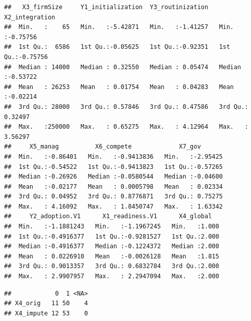 \documentclass[
]{article}
\newenvironment{Shaded}{\begin{snugshade}}{\end{snugshade}}
\newcommand{\DataTypeTok}[1]{\textcolor[rgb]{0.13,0.29,0.53}{#1}}
\newcommand{\DecValTok}[1]{\textcolor[rgb]{0.00,0.00,0.81}{#1}}
\newcommand{\KeywordTok}[1]{\textcolor[rgb]{0.13,0.29,0.53}{\textbf{#1}}}
\newcommand{\NormalTok}[1]{#1}
\newcommand{\OperatorTok}[1]{\textcolor[rgb]{0.81,0.36,0.00}{\textbf{#1}}}
\newcommand{\StringTok}[1]{\textcolor[rgb]{0.31,0.60,0.02}{#1}}
\begin{document}
\begin{verbatim}
##   X3_firmSize     Y1_initialization  Y3_routinization   X2_integration    
##  Min.   :    65   Min.   :-5.42871   Min.   :-1.41257   Min.   :-0.75756  
##  1st Qu.:  6586   1st Qu.:-0.05625   1st Qu.:-0.92351   1st Qu.:-0.75756  
##  Median : 14000   Median : 0.32550   Median : 0.05474   Median :-0.53722  
##  Mean   : 26253   Mean   : 0.01754   Mean   : 0.04283   Mean   :-0.02214  
##  3rd Qu.: 28000   3rd Qu.: 0.57846   3rd Qu.: 0.47586   3rd Qu.: 0.32497  
##  Max.   :250000   Max.   : 0.65275   Max.   : 4.12964   Max.   : 3.56297  
##     X5_manag          X6_compete             X7_gov        
##  Min.   :-0.86401   Min.   :-0.9413836   Min.   :-2.95425  
##  1st Qu.:-0.54522   1st Qu.:-0.9413823   1st Qu.:-0.57265  
##  Median :-0.26926   Median :-0.0580544   Median :-0.04600  
##  Mean   :-0.02177   Mean   : 0.0005798   Mean   : 0.02334  
##  3rd Qu.: 0.04952   3rd Qu.: 0.8776871   3rd Qu.: 0.75275  
##  Max.   : 4.16092   Max.   : 1.8450747   Max.   : 1.63342  
##     Y2_adoption.V1      X1_readiness.V1      X4_global    
##  Min.   :-1.1881243   Min.   :-1.1967245   Min.   :1.000  
##  1st Qu.:-0.4916377   1st Qu.:-0.9281527   1st Qu.:2.000  
##  Median :-0.4916377   Median :-0.1224372   Median :2.000  
##  Mean   : 0.0226910   Mean   :-0.0026128   Mean   :1.815  
##  3rd Qu.: 0.9013357   3rd Qu.: 0.6832784   3rd Qu.:2.000  
##  Max.   : 2.9907957   Max.   : 2.2947094   Max.   :2.000
\end{verbatim}

\begin{Shaded}
\end{Shaded}

\begin{verbatim}
##            0  1 <NA>
## X4_orig   11 50    4
## X4_impute 12 53    0
\end{verbatim}
\end{document}
